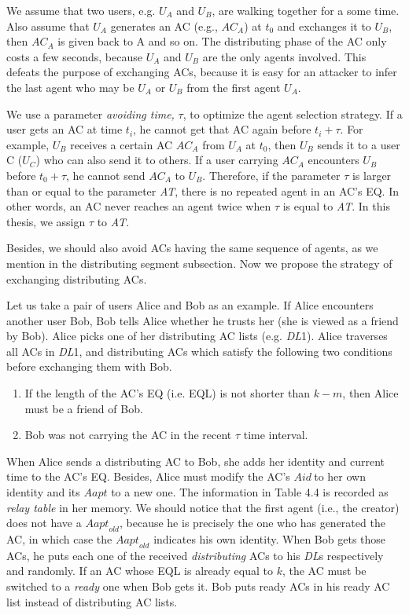We assume that two users, e.g. $U_A$ and $U_B$, are walking together for a some time. Also assume that $U_A$ generates an AC (e.g., ${AC}_A$) at $t_0$ and exchanges it to $U_B$, then ${AC}_A$ is given back to A and so on. The distributing phase of the AC only costs a few seconds, because $U_A$ and $U_B$ are the only agents involved. This defeats the purpose of exchanging ACs, because it is easy for an attacker to infer the last agent who may be $U_A$ or $U_B$ from the first agent $U_A$. 

We use a parameter \textit{avoiding time,} $\tau$, to optimize the agent selection strategy. If a user gets an AC at time $t_i$, he cannot get that AC again before $t_i+\tau $. For example, $U_B$ receives a certain AC ${AC}_A$ from $U_A$ at $t_0$, then $U_B$ sends it to a user C ($U_C$) who can also send it to others. If a user carrying ${AC}_A$ encounters $U_B$  before $t_0+\tau $, he cannot send ${AC}_A$ to $U_B$. Therefore, if the parameter $\tau $ is larger than or equal to the parameter \textit{AT}, there is no repeated agent in an AC's EQ. In other words, an AC never reaches an agent twice when $\tau $ is equal to \textit{AT}. In this thesis, we assign $\tau $ to \textit{AT}. 

Besides, we should also avoid ACs having the same sequence of agents, as we mention in the distributing segment subsection. Now we propose the strategy of exchanging distributing ACs.

Let us take a pair of users Alice and Bob as an example. If Alice encounters another user Bob, Bob tells Alice whether he trusts her (she is viewed as a friend by Bob). Alice picks one of her distributing AC lists (e.g. \textit{DL}1). Alice traverses all ACs in \textit{DL}1, and distributing ACs which satisfy the following two conditions before exchanging them with Bob.

\begin{enumerate}
\item  If the length of the AC's EQ (i.e. EQL) is not shorter than $k-m$, then Alice must be a friend of Bob.

\item  Bob was not carrying the AC in the recent $\tau $ time interval.
\end{enumerate}

When Alice sends a distributing AC to Bob, she adds her identity and current time to the AC's EQ. Besides, Alice must modify the AC's $Aid\mathrm{\ }$to her own identity and its $Aapt$ to a new one. The information in Table 4.4 is recorded as \textit{relay table} in her memory. We should notice that the first agent (i.e., the creator) does not have a ${Aapt}_{old}$, because he is precisely the one who has generated the AC, in which case the ${Aapt}_{old}$ indicates his own identity. When Bob gets those ACs, he puts each one of the received \textit{distributing} ACs to his \textit{DL}s respectively and randomly. If an AC whose EQL is already equal to $k$, the AC must be switched to a \textit{ready} one when Bob gets it. Bob puts ready ACs in his ready AC list instead of distributing AC lists.

